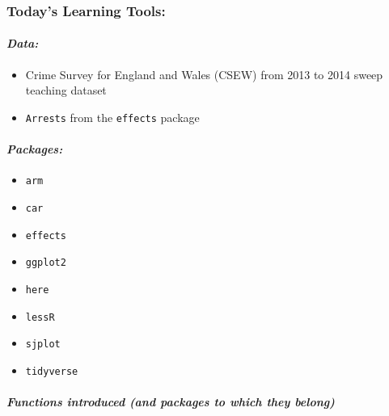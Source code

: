 \documentclass[
]{book}
\providecommand{\tightlist}{%
  \setlength{\itemsep}{0pt}\setlength{\parskip}{0pt}}
\begin{document}
\hypertarget{todays-learning-tools-8}{%
\subsubsection*{Today's Learning Tools:}\label{todays-learning-tools-8}}

\hypertarget{data-8}{%
\paragraph*{\texorpdfstring{\emph{Data:}}{Data:}}\label{data-8}}

\begin{itemize}
\tightlist
\item
  Crime Survey for England and Wales (CSEW) from 2013 to 2014 sweep teaching dataset
\item
  \texttt{Arrests} from the \texttt{effects} package
\end{itemize}

\hypertarget{packages-9}{%
\paragraph*{\texorpdfstring{\emph{Packages:}}{Packages:}}\label{packages-9}}

\begin{itemize}
\tightlist
\item
  \texttt{arm}
\item
  \texttt{car}
\item
  \texttt{effects}
\item
  \texttt{ggplot2}
\item
  \texttt{here}
\item
  \texttt{lessR}
\item
  \texttt{sjplot}
\item
  \texttt{tidyverse}
\end{itemize}

\hypertarget{functions-introduced-and-packages-to-which-they-belong-8}{%
\paragraph*{\texorpdfstring{\emph{Functions introduced (and packages to which they belong)}}{Functions introduced (and packages to which they belong)}}\label{functions-introduced-and-packages-to-which-they-belong-8}}
\end{document}
